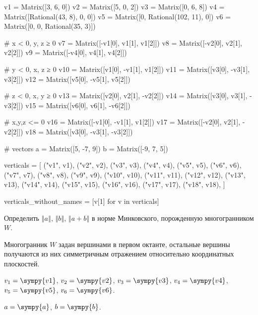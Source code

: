 
\renewcommand*{\proofname}{Решение}


\begin{sympycode}
v1 = Matrix([3, 6, 0])
v2 = Matrix([5, 0, 2])
v3 = Matrix([0, 6, 8])
v4 = Matrix([Rational(43, 8), 0, 0])
v5 = Matrix([0, Rational(102, 11), 0])
v6 = Matrix([0, 0, Rational(35, 3)])

# x < 0, y, z ≥ 0
v7 = Matrix([-v1[0], v1[1], v1[2]])
v8 = Matrix([-v2[0], v2[1], v2[2]])
v9 = Matrix([-v4[0], v4[1], v4[2]])

# y < 0, x, z ≥ 0
v10 = Matrix([v1[0], -v1[1], v1[2]])
v11 = Matrix([v3[0], -v3[1], v3[2]])
v12 = Matrix([v5[0], -v5[1], v5[2]])

# z < 0, x, y ≥ 0
v13 = Matrix([v2[0], v2[1], -v2[2]])
v14 = Matrix([v3[0], v3[1], -v3[2]])
v15 = Matrix([v6[0], v6[1], -v6[2]])

# x,y,z <= 0
v16 = Matrix([-v1[0], -v1[1], v1[2]])
v17 = Matrix([-v2[0], v2[1], -v2[2]])
v18 = Matrix([v3[0], -v3[1], -v3[2]])

# vectors
a = Matrix([5, -7, 9])
b = Matrix([-9, 7, 5])

verticals = [
    ("v1", v1), 
    ("v2", v2), 
    ("v3", v3), 
    ("v4", v4), 
    ("v5", v5), 
    ("v6", v6),
    ("v7", v7),
    ("v8", v8),
    ("v9", v9),
    ("v10", v10),
    ("v11", v11),
    ("v12", v12),
    ("v13", v13),
    ("v14", v14),
    ("v15", v15),
    ("v16", v16),
    ("v17", v17),
    ("v18", v18),
]

verticals_without_names = [v[1] for v in verticals]
\end{sympycode}

\begin{problem}
Определить $\left\Vert a \right\Vert$, $\left\Vert b \right\Vert$,
$\left\Vert a + b \right\Vert$ в норме Минковского, порожденную многогранником $W$.

Многогранник $W$ задан вершинами в первом октанте, остальные вершины получаются из них симметричным отражением относительно координатных плоскостей.

\(v_1 = \sympy{v1}\), \(v_2 = \sympy{v2}\), \(v_3 = \sympy{v3}\), \(v_4 = \sympy{v4}\), \(v_5 = \sympy{v5}\), \(v_6 = \sympy{v6}\).

\(a = \sympy{a}\), \(b = \sympy{b}\).
\end{problem}

